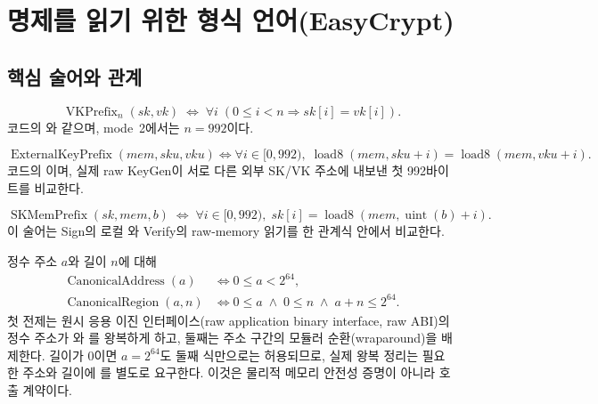 \section{명제를 읽기 위한 형식 언어(EasyCrypt)}
\label{sec:formal-language}

\subsection{핵심 술어와 관계}

\begin{definition}
\label{def:vk-prefix}
\[
  \operatorname{VKPrefix}_{n}(sk,vk)
  \;\Longleftrightarrow\;
  \forall i\;(0\le i<n\Rightarrow sk[i]=vk[i]).
\]
코드의 와 같으며, mode~2에서는 \(n=992\)이다.
\end{definition}

\begin{definition}
\label{def:external-prefix}
\[
  \operatorname{ExternalKeyPrefix}(mem,sku,vku)
  \Longleftrightarrow
  \forall i\in[0,992),\;
  \operatorname{load8}(mem,sku+i)=\operatorname{load8}(mem,vku+i).
\]
코드의 이며, 실제 raw KeyGen이 서로 다른
외부 SK/VK 주소에 내보낸 첫 992바이트를 비교한다.
\end{definition}

\begin{definition}
\label{def:mem-prefix}
\[
  \operatorname{SKMemPrefix}(sk,mem,b)
  \;\Longleftrightarrow\;
  \forall i\in[0,992),\;
  sk[i]=\operatorname{load8}(mem,\operatorname{uint}(b)+i).
\]
이 술어는 Sign의 로컬 와 Verify의 raw-memory 읽기를
한 관계식 안에서 비교한다.
\end{definition}

\begin{definition}
\label{def:canonical-region}
정수 주소 \(a\)와 길이 \(n\)에 대해
\[
\begin{aligned}
  \operatorname{CanonicalAddress}(a)
    &\Longleftrightarrow 0\le a<2^{64},\\
  \operatorname{CanonicalRegion}(a,n)
    &\Longleftrightarrow
      0\le a\;\land\;0\le n\;\land\;a+n\le 2^{64}.
\end{aligned}
\]
첫 전제는 원시 응용 이진 인터페이스(raw application binary interface, raw
ABI)의 정수 주소가 와
를 왕복하게 하고, 둘째는 주소 구간의 모듈러
순환(wraparound)을 배제한다. 길이가 0이면 \(a=2^{64}\)도 둘째 식만으로는
허용되므로, 실제
왕복 정리는 필요한 주소와 길이에 를
별도로 요구한다. 이것은 물리적 메모리 안전성 증명이 아니라 호출 계약이다.
\end{definition}

